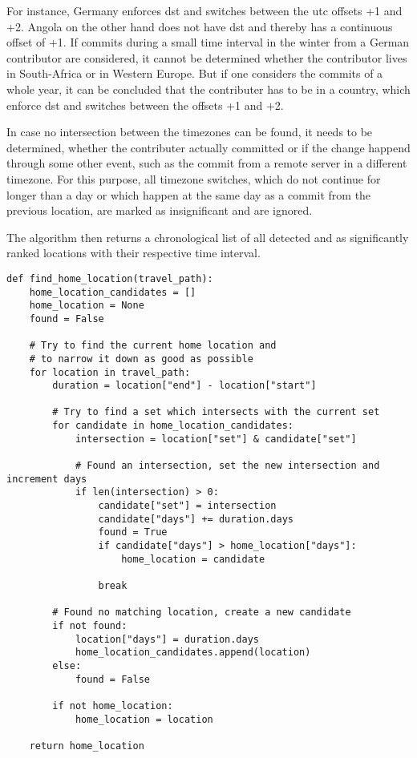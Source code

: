 For instance, Germany enforces \ac{dst} and switches between the \ac{utc} offsets +1 and +2. Angola on the other hand does not have \ac{dst} and thereby has a continuous offset of +1.
If commits during a small time interval in the winter from a German contributor are considered, it cannot be determined whether the contributor lives in South-Africa or in Western Europe.
But if one considers the commits of a whole year, it can be concluded that the contributer has to be in a country, which enforce \ac{dst} and switches between the offsets +1 and +2.

In case no intersection between the timezones can be found, it needs to be determined, whether the contributer actually committed or if the change happend through some other event, such as the commit from a remote server in a different timezone.
For this purpose, all timezone switches, which do not continue for longer than a day or which happen at the same day as a commit from the previous location, are marked as insignificant and are ignored.

The algorithm then returns a chronological list of all detected and as significantly ranked locations with their respective time interval.


\begin{verbatim}
def find_home_location(travel_path):
    home_location_candidates = []
    home_location = None
    found = False

    # Try to find the current home location and
    # to narrow it down as good as possible
    for location in travel_path:
        duration = location["end"] - location["start"]

        # Try to find a set which intersects with the current set
        for candidate in home_location_candidates:
            intersection = location["set"] & candidate["set"]

            # Found an intersection, set the new intersection and increment days
            if len(intersection) > 0:
                candidate["set"] = intersection
                candidate["days"] += duration.days
                found = True
                if candidate["days"] > home_location["days"]:
                    home_location = candidate

                break

        # Found no matching location, create a new candidate
        if not found:
            location["days"] = duration.days
            home_location_candidates.append(location)
        else:
            found = False

        if not home_location:
            home_location = location

    return home_location
\end{verbatim}
\begingroup
{}\label{lst:home-location-analysis}
\endgroup

